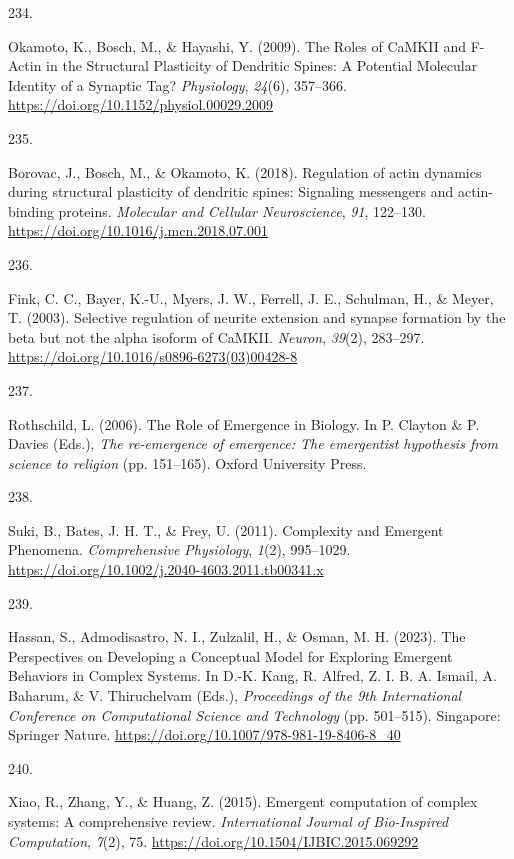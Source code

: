 \documentclass[
  11pt,
  letterpaper,
]{scrreprt}
\newlength{\cslhangindent}
\newlength{\csllabelwidth}
\newenvironment{CSLReferences}[2] %
 {\begin{list}{}{%
  \setlength{\itemindent}{0pt}
  \setlength{\leftmargin}{0pt}
  \setlength{\parsep}{0pt}
  \ifodd #1
   \setlength{\leftmargin}{\cslhangindent}
   \setlength{\itemindent}{-1\cslhangindent}
  \fi
  \setlength{\itemsep}{#2\baselineskip}}}
 {\end{list}}
\newcommand{\CSLLeftMargin}[1]{\parbox[t]{\csllabelwidth}{\strut#1\strut}}
\newcommand{\CSLRightInline}[1]{\parbox[t]{\linewidth - \csllabelwidth}{\strut#1\strut}}
\begin{document}
\begin{CSLReferences}{0}{0}
\CSLLeftMargin{234. }%
\CSLRightInline{Okamoto, K., Bosch, M., \& Hayashi, Y. (2009). The
{Roles} of {CaMKII} and {F-Actin} in the {Structural Plasticity} of
{Dendritic Spines}: {A Potential Molecular Identity} of a {Synaptic
Tag}? \emph{Physiology}, \emph{24}(6), 357--366.
\url{https://doi.org/10.1152/physiol.00029.2009}}

\CSLLeftMargin{235. }%
\CSLRightInline{Borovac, J., Bosch, M., \& Okamoto, K. (2018).
Regulation of actin dynamics during structural plasticity of dendritic
spines: {Signaling} messengers and actin-binding proteins.
\emph{Molecular and Cellular Neuroscience}, \emph{91}, 122--130.
\url{https://doi.org/10.1016/j.mcn.2018.07.001}}

\CSLLeftMargin{236. }%
\CSLRightInline{Fink, C. C., Bayer, K.-U., Myers, J. W., Ferrell, J. E.,
Schulman, H., \& Meyer, T. (2003). Selective regulation of neurite
extension and synapse formation by the beta but not the alpha isoform of
{CaMKII}. \emph{Neuron}, \emph{39}(2), 283--297.
\url{https://doi.org/10.1016/s0896-6273(03)00428-8}}

\CSLLeftMargin{237. }%
\CSLRightInline{Rothschild, L. (2006). The {Role} of {Emergence} in
{Biology}. In P. Clayton \& P. Davies (Eds.), \emph{The re-emergence of
emergence: The emergentist hypothesis from science to religion} (pp.
151--165). Oxford University Press.}

\CSLLeftMargin{238. }%
\CSLRightInline{Suki, B., Bates, J. H. T., \& Frey, U. (2011).
Complexity and {Emergent Phenomena}. \emph{Comprehensive Physiology},
\emph{1}(2), 995--1029.
\url{https://doi.org/10.1002/j.2040-4603.2011.tb00341.x}}

\CSLLeftMargin{239. }%
\CSLRightInline{Hassan, S., Admodisastro, N. I., Zulzalil, H., \& Osman,
M. H. (2023). The {Perspectives} on {Developing} a {Conceptual Model}
for {Exploring Emergent Behaviors} in {Complex Systems}. In D.-K. Kang,
R. Alfred, Z. I. B. A. Ismail, A. Baharum, \& V. Thiruchelvam (Eds.),
\emph{Proceedings of the 9th {International Conference} on
{Computational Science} and {Technology}} (pp. 501--515). Singapore:
Springer Nature. \url{https://doi.org/10.1007/978-981-19-8406-8_40}}

\CSLLeftMargin{240. }%
\CSLRightInline{Xiao, R., Zhang, Y., \& Huang, Z. (2015). Emergent
computation of complex systems: A comprehensive review.
\emph{International Journal of Bio-Inspired Computation}, \emph{7}(2),
75. \url{https://doi.org/10.1504/IJBIC.2015.069292}}


\end{CSLReferences}
\end{document}
